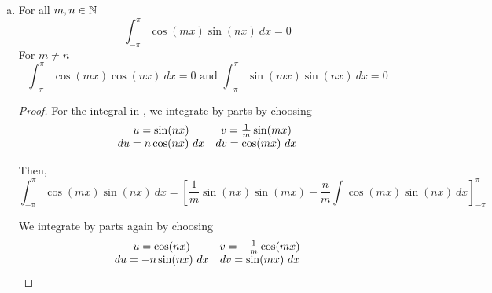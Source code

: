 \begin{problem}
\begin{enumerate}[(a)]
\begin{proof}
        Then, consider that \(\sin^2(t) = \frac{1}{2}(1 - \cos{2t})\), thus
        \begin{align}
        	\int_{-\pi}^{\pi} \sin^2(nx) ~dx & = \frac{1}{2}\int_{-\pi}^{\pi} (1 - \cos{2nx}) ~dx \\
			& = \frac{1}{2}\left[ x - \frac{1}{2n}\sin(2nx) \right]^\pi_{-\pi} \\
			& = \frac{1}{2}\left[ \pi - (-\pi) \right] \\
			& = \pi
        \end{align}

        \end{proof}
        
        \item For all \(m, n \in \mathbb{N}\)
        \begin{equation} \label{prob2c:first}
        	\int_{-\pi}^{\pi} \cos(mx)\sin(nx) ~dx = 0
        \end{equation}
        For \(m \neq n\)
        \begin{equation} \label{prob2c:second}
        	\int_{-\pi}^{\pi} \cos(mx)\cos(nx) ~dx = 0
			\text{ and }
			\int_{-\pi}^{\pi} \sin(mx)\sin(nx) ~dx = 0
        \end{equation}
        
        \begin{proof} For the integral in , we integrate by parts by choosing
        \begin{equation}
        \begin{array}{c c}
        u = \sin(nx) & v = \frac{1}{m}\sin(mx) \\
        du = n\cos(nx) ~dx & dv = \cos(mx) ~dx
        \end{array}
        \end{equation}
        
        Then,
        \begin{equation}
        	\int_{-\pi}^{\pi} \cos(mx)\sin(nx) ~dx = \left[\frac{1}{m}\sin(nx)\sin(mx)
				- \frac{n}{m} \int \cos(mx)\sin(nx) ~dx \right]_{-\pi}^{\pi}
        \end{equation}
        
        We integrate by parts again by choosing
        \begin{equation}
        \begin{array}{c c}
        u = \cos(nx) & v = -\frac{1}{m}\cos(mx) \\
        du = -n\sin(nx) ~dx & dv = \sin(mx) ~dx
        \end{array}
        \end{equation}
        

\end{proof}
\end{enumerate}
\end{problem}
